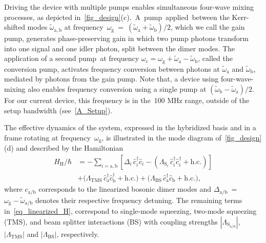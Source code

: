 \documentclass[%
reprint,
floatfix,
superscriptaddress,
amsmath,amssymb,
aps,
pra,
]{revtex4-2}
\newcommand*{\scrpt}[1]{\mathrm{#1}}
\newcommand*{\s}[1]{\ensuremath{_\scrpt{#1}}}
\begin{document}

Driving the device with multiple pumps enables simultaneous four-wave mixing processes, as depicted in~\cref{fig_design}(c).~A~pump~applied~between the Kerr-shifted modes $\tilde{\omega}\mathrm{_{a,b}}$ at frequency~$\omega\mathrm{_g}$~=~$(\tilde{\omega}\mathrm{_a}+\tilde{\omega}\mathrm{_b})/2$, which we call the gain pump, generates phase-preserving gain in which two pump photons transform into one signal and one idler photon, split between the dimer modes. The application of a second pump~at frequency $\omega\mathrm{_c}=\omega\mathrm{_g}+\tilde{\omega}\mathrm{_a}-\tilde{\omega}\mathrm{_b}$, called the conversion pump, activates frequency conversion between photons at $\tilde{\omega}\mathrm{_a}$ and $\tilde{\omega}\mathrm{_b}$, mediated by photons from the gain pump. Note that, a device using four-wave-mixing also enables frequency conversion using a single pump at $(\tilde{\omega}\mathrm{_b}-\tilde{\omega}\mathrm{_a})/2$. For our current device, this frequency is in the~100 MHz range, outside of the setup bandwidth (see~\cref{A_Setup}).

The effective dynamics of the system, expressed in the hybridized basis and in a frame rotating at frequency~$\omega\mathrm{_g}$, is illustrated in the mode diagram of~\cref{fig_design}(d)
and described by the Hamiltonian
\begin{equation}
\begin{aligned}
\hat{H}\s{H}/\hbar  & = -\sum_{i= \mathrm{a,b}} \left[\Delta_i \,\hat c^{\dagger}_{i} \hat c_{i} - \left(\Lambda_{\mathrm{S}_{i}} \, \hat c^{\dagger}_{i} \hat c^{\dagger}_{i} + \mathrm{h.c.} \right) \right]\\
 & + \Big( \Lambda\mathrm{_{TMS}} \, \hat c^{\dagger}_{\mathrm{a}} \hat c^{\dagger}_{\mathrm{b}} + \mathrm{h.c.} \Big) +
\Big( \Lambda\mathrm{_{BS}} \,\hat c^{\dagger}_{\mathrm{a}} \hat c_{\mathrm{b}} + \mathrm{h.c.} \Big),
\end{aligned}
\label{eq_linearized_H}
\end{equation}
%
where $c\mathrm{_{a/b}}$ corresponds to the linearized bosonic dimer modes and $\Delta\mathrm{_{a/b}}$~=~$\omega\mathrm{_g}-\tilde{\omega}\mathrm{_{a/b}}$ denotes their respective frequency detuning. The remaining terms in~\cref{eq_linearized_H}, correspond to single-mode squeezing, two-mode squeezing (TMS), and beam splitter interactions (BS) with coupling strengths $|\Lambda\mathrm{_{S_{a/b}}}|$, $|\Lambda\mathrm{_{TMS}}|$ and $|\Lambda\mathrm{_{BS}}|$, respectively. 
\end{document}
